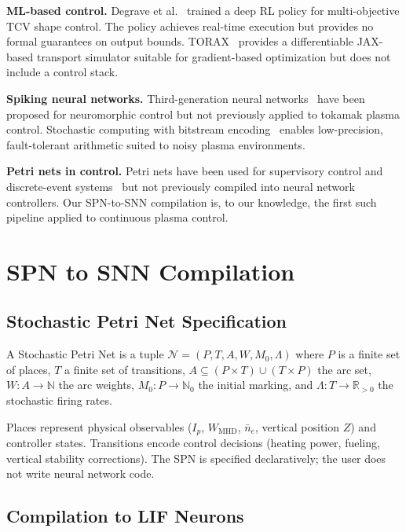 \documentclass[twocolumn,preprintnumbers,amsmath,amssymb,prl,floatfix]{revtex4-2}
\begin{document}
\textbf{ML-based control.}\quad
Degrave et al.~\cite{degrave2022} trained a deep RL policy for
multi-objective TCV shape control.  The policy achieves real-time
execution but provides no formal guarantees on output bounds.
TORAX~\cite{fanni2024torax} provides a differentiable JAX-based
transport simulator suitable for gradient-based optimization but does
not include a control stack.

\textbf{Spiking neural networks.}\quad
Third-generation neural networks~\cite{maass1997} have been proposed
for neuromorphic control but not previously applied to tokamak plasma
control.  Stochastic computing with bitstream
encoding~\cite{alaghi2013} enables low-precision, fault-tolerant
arithmetic suited to noisy plasma environments.

\textbf{Petri nets in control.}\quad
Petri nets have been used for supervisory control and discrete-event
systems~\cite{murata1989} but not previously compiled into neural
network controllers.  Our SPN-to-SNN compilation is, to our knowledge,
the first such pipeline applied to continuous plasma control.


\section{SPN to SNN Compilation}
\label{sec:compilation}

\subsection{Stochastic Petri Net Specification}

A Stochastic Petri Net is a tuple
$\mathcal{N} = (P, T, A, W, M_0, \Lambda)$
where $P$ is a finite set of places, $T$ a finite set of transitions,
$A \subseteq (P \times T) \cup (T \times P)$ the arc set,
$W: A \to \mathbb{N}$ the arc weights,
$M_0: P \to \mathbb{N}_0$ the initial marking, and
$\Lambda: T \to \mathbb{R}_{>0}$ the stochastic firing rates.

Places represent physical observables ($I_p$, $W_\mathrm{MHD}$,
$\bar{n}_e$, vertical position $Z$) and controller states.
Transitions encode control decisions (heating power, fueling, vertical
stability corrections).  The SPN is specified declaratively; the user
does not write neural network code.

\subsection{Compilation to LIF Neurons}
\label{sec:lif}
\end{document}
